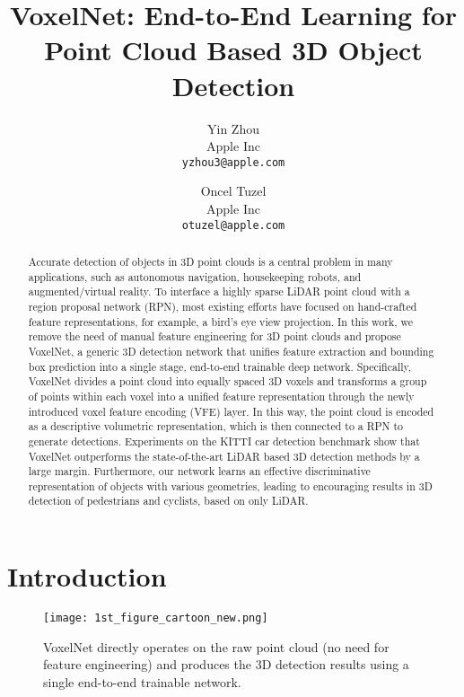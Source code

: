\documentclass[10pt,twocolumn,letterpaper]{article}
\begin{document}
\title{VoxelNet: End-to-End Learning for Point Cloud Based 3D Object Detection}


\author{Yin Zhou\\
Apple Inc\\
{\tt\small yzhou3@apple.com}
\and
Oncel Tuzel\\
Apple Inc\\
{\tt\small otuzel@apple.com}
}
\maketitle


\begin{abstract}
Accurate detection of objects in 3D point clouds is a central problem in many applications, such as autonomous navigation, housekeeping robots, and augmented/virtual reality. To interface a highly sparse LiDAR point cloud with a region proposal network (RPN), most existing efforts have focused on hand-crafted feature representations, for example, a bird's eye view projection. In this work, we remove the need of manual feature engineering for 3D point clouds and propose VoxelNet, a generic 3D detection network that unifies feature extraction and bounding box prediction into a single stage, end-to-end trainable deep network.
Specifically, VoxelNet divides a point cloud into equally spaced 3D voxels and transforms a group of points within each voxel into a unified feature representation through the newly introduced voxel feature encoding (VFE) layer. In this way, the point cloud is encoded as a descriptive volumetric representation, which is then connected to a RPN to generate detections. Experiments on the KITTI car detection benchmark show that VoxelNet outperforms  the state-of-the-art LiDAR based 3D detection methods by a large margin. Furthermore, our network learns an effective discriminative  representation of objects with various geometries, leading to encouraging results in 3D detection of pedestrians and cyclists, based on only LiDAR.





\end{abstract}

\section{Introduction}

\begin{figure}[!ht]
\centering
    \texttt{[image: 1st\_figure\_cartoon\_new.png]}
\caption{VoxelNet directly operates on the raw point cloud (no need for feature engineering)  and produces the 3D detection results using a single end-to-end trainable network. }
\label{fig:1st_figure}
\end{figure}
\end{document}
